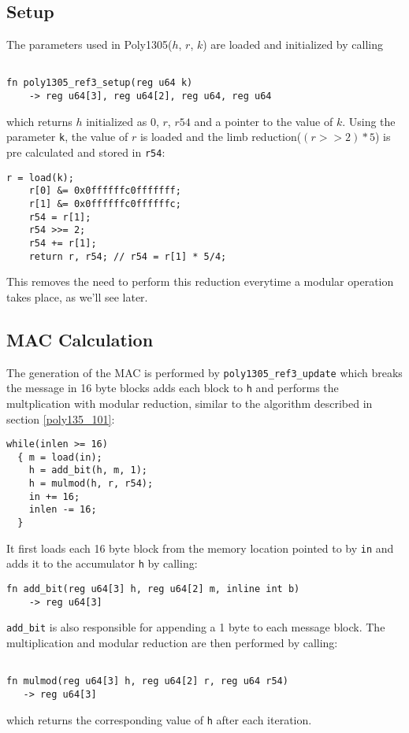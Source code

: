 \documentclass[twocolumn]{article}
\begin{document}
\subsection{Setup}
The parameters used in Poly1305($h$, $r$, $k$) are loaded and initialized by calling 

\begin{Verbatim}[fontsize=\footnotesize]

fn poly1305_ref3_setup(reg u64 k) 
    -> reg u64[3], reg u64[2], reg u64, reg u64

\end{Verbatim}

which returns $h$ initialized as 0, $r$, $r54$ and a pointer to the value of $k$.
Using the parameter \texttt{k}, the value of $r$ is loaded and the limb reduction($(r>>2)*5$) is pre calculated and stored in \texttt{r54}:
\begin{Verbatim}[fontsize=\footnotesize]
    r = load(k);
    r[0] &= 0x0ffffffc0fffffff;
    r[1] &= 0x0ffffffc0ffffffc;
    r54 = r[1];
    r54 >>= 2;
    r54 += r[1];
    return r, r54; // r54 = r[1] * 5/4;
\end{Verbatim}
This removes the need to perform this reduction everytime a modular operation takes place, as we'll see later.

\subsection{MAC Calculation}
The generation of the MAC is performed by \texttt{poly1305\_ref3\_update} which breaks the message in 16 byte blocks adds each block to \texttt{h} and performs
the multplication with modular reduction, similar to the algorithm described in section \ref{poly135_101}:
\begin{Verbatim}[fontsize=\footnotesize]
while(inlen >= 16)
  { m = load(in);
    h = add_bit(h, m, 1);
    h = mulmod(h, r, r54);
    in += 16;
    inlen -= 16;
  }
\end{Verbatim}

It first loads each 16 byte block from the memory location pointed to by \texttt{in} and adds it to the accumulator \texttt{h} by calling: 
\begin{Verbatim}[fontsize=\footnotesize]
fn add_bit(reg u64[3] h, reg u64[2] m, inline int b) 
    -> reg u64[3]
\end{Verbatim}

\texttt{add\_bit} is also responsible for appending a 1 byte to each message block. The multiplication and modular reduction are then performed by calling:
\begin{Verbatim}[fontsize=\footnotesize]

fn mulmod(reg u64[3] h, reg u64[2] r, reg u64 r54) 
   -> reg u64[3]

\end{Verbatim}
which returns the corresponding value of \texttt{h} after each iteration.
\end{document}
